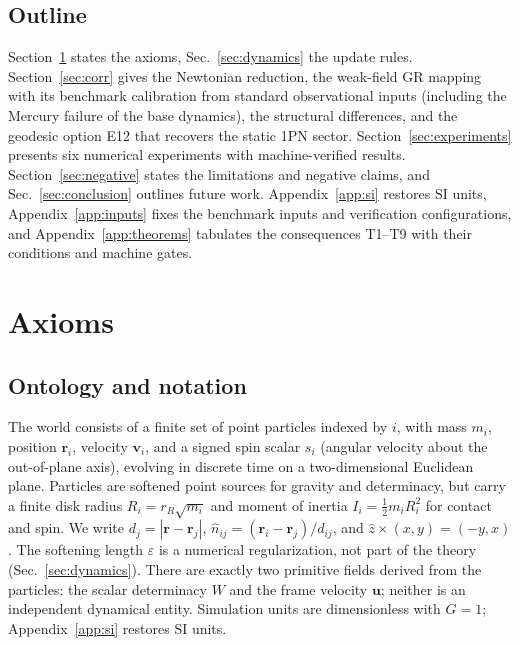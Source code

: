 \documentclass[aps,reprint,amsmath,amssymb,nofootinbib,superscriptaddress,floatfix]{revtex4-2}
\newcommand{\vect}[1]{\bm{#1}}
\begin{document}
\subsection{Outline}

Section~\ref{sec:axioms} states the axioms, Sec.~\ref{sec:dynamics} the
update rules.
Section~\ref{sec:corr} gives the Newtonian reduction, the weak-field GR
mapping with its benchmark calibration from standard observational
inputs (including the Mercury failure
of the base dynamics), the structural differences, and the geodesic
option E12 that recovers the static 1PN sector.
Section~\ref{sec:experiments} presents six numerical experiments with
machine-verified results.
Section~\ref{sec:negative} states the limitations and negative claims,
and Sec.~\ref{sec:conclusion} outlines future work.
Appendix~\ref{app:si} restores SI units,
Appendix~\ref{app:inputs} fixes the benchmark inputs and verification
configurations, and Appendix~\ref{app:theorems} tabulates the
consequences T1--T9 with their conditions and machine gates.

\section{Axioms}
\label{sec:axioms}

\subsection{Ontology and notation}

The world consists of a finite set of point particles indexed by $i$,
with mass
$m_i$, position $\vect{r}_i$, velocity $\vect{v}_i$, and a signed spin
scalar $s_i$ (angular velocity about the out-of-plane axis), evolving
in discrete time on a two-dimensional Euclidean plane.
Particles are softened point sources for gravity and determinacy, but
carry a finite disk radius $R_i = r_R\sqrt{m_i}$ and moment of
inertia $I_i = \tfrac{1}{2}m_iR_i^2$ for contact and spin.
We write $d_j = |\vect{r}-\vect{r}_j|$,
$\hat{n}_{ij} = (\vect{r}_i-\vect{r}_j)/d_{ij}$, and
$\hat{z}\times(x,y) = (-y,x)$.
The softening length $\varepsilon$ is a numerical regularization, not
part of the theory (Sec.~\ref{sec:dynamics}).
There are exactly two primitive fields derived from the particles: the
scalar determinacy $W$ and the frame velocity $\vect{u}$; neither is an
independent dynamical entity.
Simulation units are dimensionless with $G = 1$; Appendix~\ref{app:si}
restores SI units.
\end{document}
